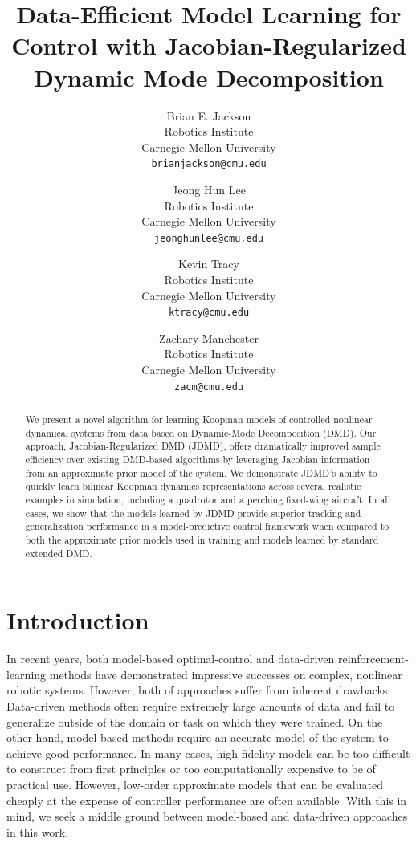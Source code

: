 \documentclass{article}
\title{
  Data-Efficient Model Learning for Control with Jacobian-Regularized Dynamic Mode Decomposition}
\author{
Brian E. Jackson \\
Robotics Institute \\
Carnegie Mellon University \\
\texttt{brianjackson@cmu.edu} \\
\and
Jeong Hun Lee \\
Robotics Institute \\
Carnegie Mellon University \\
\texttt{jeonghunlee@cmu.edu} \\
\and
Kevin Tracy \\
Robotics Institute \\
Carnegie Mellon University \\
\texttt{ktracy@cmu.edu} \\
\and
Zachary Manchester \\
Robotics Institute \\
Carnegie Mellon University \\
\texttt{zacm@cmu.edu} \\
}
\begin{document}
\maketitle

\begin{abstract}
  We present a novel algorithm for learning Koopman models of controlled nonlinear dynamical
  systems from data based on Dynamic-Mode Decomposition (DMD).  Our approach,
  Jacobian-Regularized DMD (JDMD), offers dramatically improved sample efficiency over
  existing DMD-based algorithms by leveraging Jacobian information from an approximate prior
  model of the system.  We demonstrate JDMD's ability to quickly learn bilinear Koopman
  dynamics representations across several realistic examples in simulation, including a
  quadrotor and a perching fixed-wing aircraft.  In all cases, we show that the models
  learned by JDMD provide superior tracking and generalization performance in a
  model-predictive control framework when compared to both the approximate prior models used
  in training and models learned by standard extended DMD.
\end{abstract}

\section{Introduction}

In recent years, both model-based optimal-control \cite{Farshidian2017,Kuindersma2014,Bjelonic2021,Subosits2019} and data-driven reinforcement-learning methods \cite{Karnchanachari2020,Hoeller2020,Li2021} have demonstrated impressive successes on complex, nonlinear robotic systems. However, both of approaches suffer from inherent drawbacks: Data-driven methods often require extremely large amounts of data and fail to generalize outside of the domain or task on which they were trained. On the other hand, model-based methods require an accurate model of the system to achieve good performance. In many cases, high-fidelity models can be too difficult to construct from first principles or too computationally expensive to be of practical use. However, low-order approximate models that can be evaluated cheaply at the expense of controller performance are often available. With this in mind, we seek a middle ground between model-based and data-driven approaches in this work.
\end{document}
